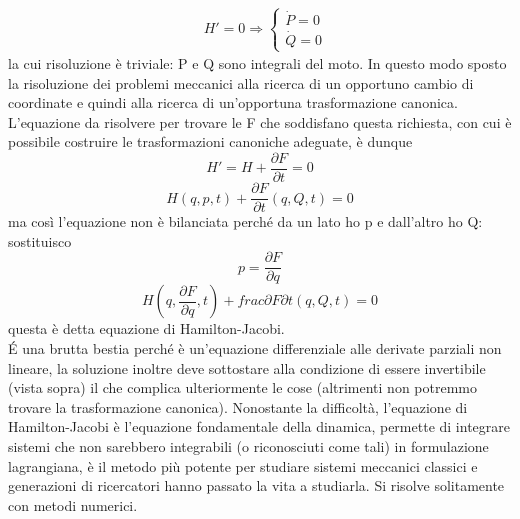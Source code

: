\documentclass[
10pt, %
a4paper, %
oneside, %
headinclude,footinclude, %
BCOR5mm, %
]{scrartcl}
\begin{document}
\begin{align*}
&H' = 0 \Rightarrow
\begin{cases}
	\dot{P} = 0\\
	\dot{Q} = 0
\end{cases}
\end{align*}
la cui risoluzione è triviale: P e Q sono integrali del moto. In questo modo sposto la risoluzione dei problemi meccanici alla ricerca di un opportuno cambio di coordinate e quindi alla ricerca di un'opportuna trasformazione canonica.\\
L'equazione da risolvere per trovare le F che soddisfano questa richiesta, con cui è possibile costruire le trasformazioni canoniche adeguate, è dunque
\[H' = H+\frac{\partial F}{\partial t}=0\]
\[H(q, p, t)+\frac{\partial F}{\partial t}(q, Q, t)=0\]
ma così l'equazione non è bilanciata perché da un lato ho p e dall'altro ho Q: sostituisco 
\[p = \frac{\partial F}{\partial q}\]
\[H(q, \frac{\partial F}{\partial q}, t)+frac{\partial F}{\partial t}(q, Q, t)=0\]
questa è detta equazione di Hamilton-Jacobi.\\
\'E una brutta bestia perché è un'equazione differenziale alle derivate parziali non lineare, la soluzione inoltre deve sottostare alla condizione di essere invertibile (vista sopra) il che complica ulteriormente le cose (altrimenti non potremmo trovare la trasformazione canonica). Nonostante la difficoltà, l'equazione di Hamilton-Jacobi è l'equazione fondamentale della dinamica, permette di integrare sistemi che non sarebbero integrabili (o riconosciuti come tali) in formulazione lagrangiana, è il metodo più potente per studiare sistemi meccanici classici e generazioni di ricercatori hanno passato la vita a studiarla. Si risolve solitamente con metodi numerici.
\end{document}
